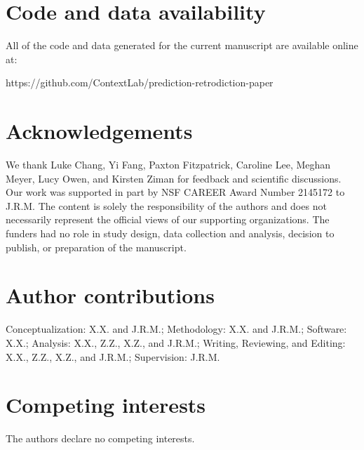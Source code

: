 \documentclass[10pt]{article}
\begin{document}
\section*{Code and data availability}

All of the code and data generated for the current manuscript are available
online at:

https://github.com/ContextLab/prediction-retrodiction-paper

% 


\section*{Acknowledgements}

We thank Luke Chang, Yi Fang, Paxton Fitzpatrick, Caroline Lee, Meghan Meyer,
Lucy Owen, and Kirsten Ziman for feedback and scientific discussions. Our work
was supported in part by NSF CAREER Award Number 2145172 to J.R.M. The content
is solely the responsibility of the authors and does not necessarily represent
the official views of our supporting organizations. The funders had no role in
study design, data collection and analysis, decision to publish, or preparation
of the manuscript.

\section*{Author contributions}

Conceptualization: X.X. and J.R.M.; Methodology: X.X. and J.R.M.; Software:
X.X.; Analysis: X.X., Z.Z., X.Z., and J.R.M.; Writing, Reviewing, and Editing:
X.X., Z.Z., X.Z., and J.R.M.; Supervision: J.R.M.

\section*{Competing interests}

The authors declare no competing interests.
\end{document}
